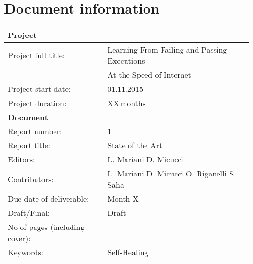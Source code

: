 \documentclass[a4paper,oneside]{scrreprt}
\begin{document}
\maketitle
\chapter*{Document information}\label{docInfo}
 \begin{tabular}[t]{|l|l|}
   \hline
   \multicolumn{2}{|l|}{\bf Project} \\ \hline
   Project full title: & Learning From Failing and Passing Executions\\ 
    &  At the Speed of Internet\\ \hline
   Project start date: & 01.11.2015 \\ \hline
   Project duration: & XX\,months \\ \hline

   \multicolumn{2}{|l|}{\bf Document} \\ \hline
   Report number: & 1\\ \hline
   Report title: & State of the Art \\ \hline
   Editors: & L. Mariani D. Micucci \\ \hline
   Contributors: & L. Mariani  D. Micucci O. Riganelli S. Saha \\ \hline
   Due date of deliverable: & Month X\\ \hline
   Draft/Final: & Draft\\ \hline
   No of pages (including cover): & \pageref{LastPage} \\ \hline
   Keywords: & Self-Healing\\ \hline
\end{tabular}
\newpage
\end{document}
